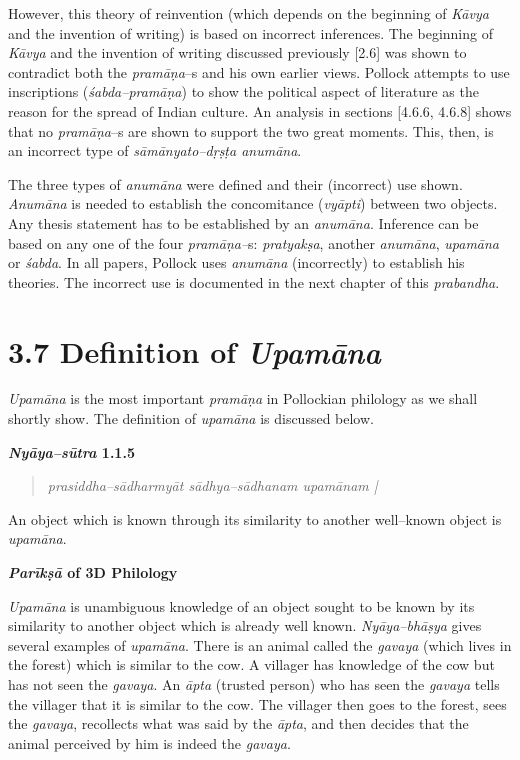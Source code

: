 However, this theory of reinvention (which depends on the beginning of \textit{Kāvya} and the invention of writing) is based on incorrect inferences. The beginning of \textit{Kāvya} and the invention of writing discussed previously [2.6] was shown to contradict both the \textit{pramāṇa}–s and his own earlier views. Pollock attempts to use inscriptions (\textit{śabda–pramāṇa}) to show the political aspect of literature as the reason for the spread of Indian culture. An analysis in sections [4.6.6, 4.6.8] shows that no\textit{ pramāṇa}–s are shown to support the two great moments. This, then, is an incorrect type of \textit{sāmānyato–dṛṣṭa anumāna}.

The three types of \textit{anumāna }were defined and their (incorrect) use shown. \textit{Anumāna} is needed to establish the concomitance (\textit{vyāpti}) between two objects. Any thesis statement has to be established by an \textit{anumāna}. Inference can be based on any one of the four \textit{pramāṇa–}s: \textit{pratyakṣa}, another \textit{anumāna}, \textit{upamāna} or \textit{śabda}. In all papers, Pollock uses \textit{anumāna} (incorrectly) to establish his theories. The incorrect use is documented in the next chapter of this \textit{prabandha}.


\section*{3.7 Definition of {\it {\bfseries Upamāna}}}

\textit{Upamāna }is the most important \textit{pramāṇa} in Pollockian philology as we shall shortly show. The definition of \textit{upamāna} is discussed below.

\textbf{\textit{Nyāya–sūtra} 1.1.5}

\vspace{-.3cm}

\begin{verse}
\textit{prasiddha–sādharmyāt sādhya–sādhanam upamānam |}
\end{verse}

\vspace{-.3cm}

An object which is known through its similarity to another well–known object is \textit{upamāna}.

\textbf{\textit{Parīkṣā} of 3D Philology}

\textit{Upamāna }is unambiguous knowledge of an object sought to be known by its similarity to another object which is already well known. \textit{Nyāya–bhāṣya} gives several examples of \textit{upamāna}. There is an animal called the \textit{gavaya} (which lives in the forest) which is similar to the cow. A villager has knowledge of the cow but has not seen the \textit{gavaya}. An \textit{āpta }(trusted person) who has seen the \textit{gavaya} tells the villager that it is similar to the cow. The villager then goes to the forest, sees the \textit{gavaya}, recollects what was said by the \textit{āpta}, and then decides that the animal perceived by him is indeed the \textit{gavaya}.

